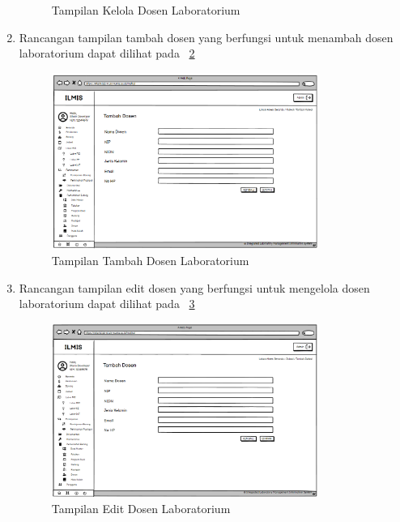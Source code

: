 \begin{enumerate}
\begin{figure}
		      \caption{Tampilan Kelola Dosen Laboratorium}
		      \label{fig:dosen}
	      \end{figure}
	\item Rancangan tampilan tambah dosen yang berfungsi untuk menambah dosen laboratorium dapat dilihat pada \pic~\ref{fig:tambah-dosen}
	      \begin{figure}
		      \centering
		      \includegraphics[width=0.82\textwidth]{konten/gambar/user interface/tambah-dosen.png}
		      \caption{Tampilan Tambah Dosen Laboratorium}
		      \label{fig:tambah-dosen}
	      \end{figure}
	\item Rancangan tampilan edit dosen yang berfungsi untuk mengelola dosen laboratorium dapat dilihat pada \pic~\ref{fig:edit-dosen}
	      \begin{figure}
		      \centering
		      \includegraphics[width=0.82\textwidth]{konten/gambar/user interface/edit-dosen.png}
		      \caption{Tampilan Edit Dosen Laboratorium}
		      \label{fig:edit-dosen}
	      \end{figure}
\end{enumerate}
